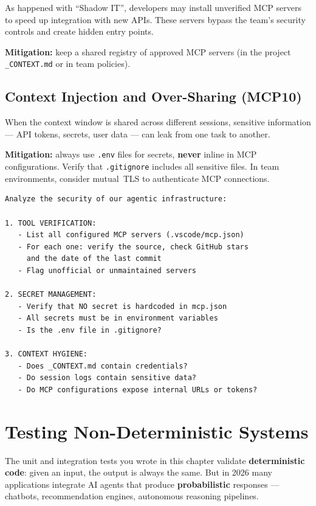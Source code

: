 As happened with ``Shadow IT'', developers may install unverified MCP servers to speed up integration with new APIs. These servers bypass the team's security controls and create hidden entry points.

\textbf{Mitigation:} keep a shared registry of approved MCP servers (in the project \texttt{\_CONTEXT.md} or in team policies).

\subsection{Context Injection and Over-Sharing (MCP10)}

When the context window is shared across different sessions, sensitive information --- API tokens, secrets, user data --- can leak from one task to another.

\textbf{Mitigation:} always use \texttt{.env} files for secrets, \textbf{never} inline in MCP configurations. Verify that \texttt{.gitignore} includes all sensitive files. In team environments, consider mutual~TLS to authenticate MCP connections.

\begin{praticabox}[title={Practice --- Agentic security audit}]
\begin{lstlisting}[language={}]
Analyze the security of our agentic infrastructure:

1. TOOL VERIFICATION:
   - List all configured MCP servers (.vscode/mcp.json)
   - For each one: verify the source, check GitHub stars
     and the date of the last commit
   - Flag unofficial or unmaintained servers

2. SECRET MANAGEMENT:
   - Verify that NO secret is hardcoded in mcp.json
   - All secrets must be in environment variables
   - Is the .env file in .gitignore?

3. CONTEXT HYGIENE:
   - Does _CONTEXT.md contain credentials?
   - Do session logs contain sensitive data?
   - Do MCP configurations expose internal URLs or tokens?
\end{lstlisting}
\end{praticabox}

\section{Testing Non-Deterministic Systems}

The unit and integration tests you wrote in this chapter validate \textbf{deterministic code}: given an input, the output is always the same. But in 2026 many applications integrate AI agents that produce \textbf{probabilistic} responses --- chatbots, recommendation engines, autonomous reasoning pipelines.

